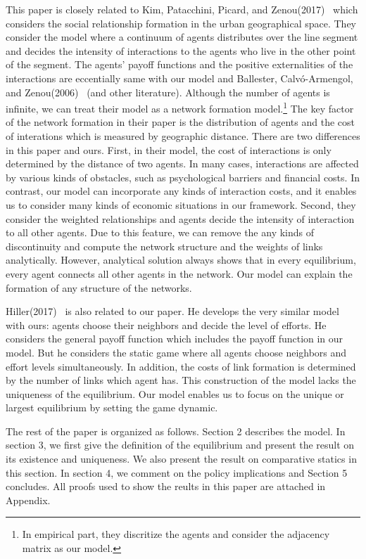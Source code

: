 \documentclass[12pt]{article}
\theoremstyle{definition}
\begin{document}
This paper is closely related to Kim, Patacchini, Picard, and Zenou(2017)~\cite{Urban} which considers the social relationship formation in the urban geographical space.
They consider the model where a continuum of agents distributes over the line segment and decides the intensity of interactions to the agents who live in the other point of the segment.
The agents' payoff functions and the positive externalities of the interactions are eccentially same with our model and Ballester, Calv\'{o}-Armengol, and Zenou(2006)~\cite{whowho} (and other literature).
Although the number of agents is infinite, we can treat their model as a network formation model.\footnote{In empirical part, they discritize the agents and consider the adjacency matrix as our model.}
The key factor of the network formation in their paper is the distribution of agents and the cost of interations which is measured by geographic distance.
There are two differences in this paper and ours.
First, in their model, the cost of interactions is only determined by the distance of two agents.
In many cases, interactions are affected by various kinds of obstacles, such as psychological barriers and financial costs.
In contrast, our model can incorporate any kinds of interaction costs, and it enables us to consider many kinds of economic situations in our framework.
Second, they consider the weighted relationships and agents decide the intensity of interaction to all other agents.
Due to this feature, we can remove the any kinds of discontinuity and compute the network structure and the weights of links analytically.
However, analytical solution always shows that in every equilibrium, every agent connects all other agents in the network.
Our model can explain the formation of any structure of the networks.

Hiller(2017)~\cite{hiller} is also related to our paper.
He develops the very similar model with ours: agents choose their neighbors and decide the level of efforts.
He considers the general payoff function which includes the payoff function in our model.
But he considers the static game where all agents choose neighbors and effort levels simultaneously.
In addition, the costs of link formation is determined by the number of links which agent has.
This construction of the model lacks the uniqueness of the equilibrium.
Our model enables us to focus on the unique or largest equilibrium by setting the game dynamic.

The rest of the paper is organized as follows.
Section 2 describes the model.
In section 3, we first give the definition of the equilibrium and present the result on its existence and uniqueness.
We also present the result on comparative statics in this section.
In section 4, we comment on the policy implications and Section 5 concludes.
All proofs used to show the reults in this paper are attached in Appendix.
\end{document}
